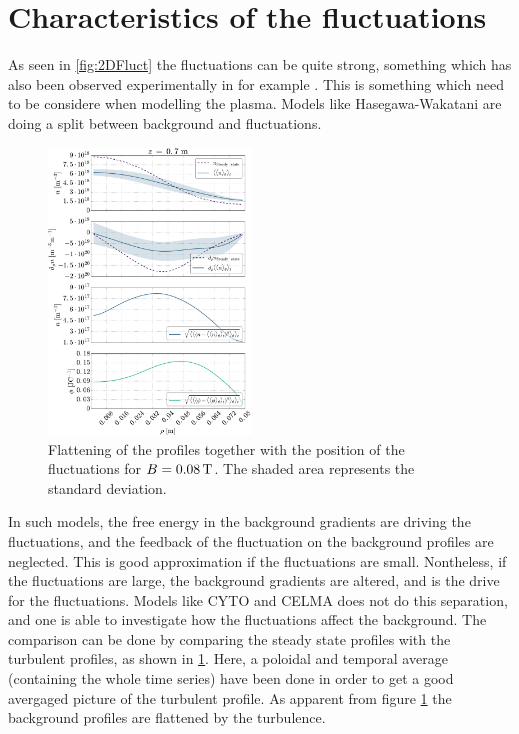 \section{Characteristics of the fluctuations}
As seen in \cref{fig:2DFluct} the fluctuations can be quite strong, something which has also been observed experimentally in for example \cite{Burin2005}.
This is something which need to be considere when modelling the plasma.
Models like Hasegawa-Wakatani \cite{Hasegawa1987,Holland2007} are doing a split between background and fluctuations.
%
\begin{figure}
    \begin{center}
    \includegraphics[width=0.48\textwidth]{fig/results/posOfFluct/posOfFluctB008}
    \end{center}
    \caption{Flattening of the profiles together with the position of the fluctuations for $B=0.08\, \text{T}$.
        The shaded area represents the standard deviation.
    }
    \label{fig:posOfFluct008}
\end{figure}
%
In such models, the free energy in the background gradients are driving the fluctuations, and the feedback of the fluctuation on the background profiles are neglected.
This is good approximation if the fluctuations are small.
Nontheless, if the fluctuations are large, the background gradients are altered, and is the drive for the fluctuations.
Models like CYTO \cite{Naulin2008,Windisch2011a,Windisch2011b} and CELMA does not do this separation, and one is able to investigate how the fluctuations affect the background.
The comparison can be done by comparing the steady state profiles with the turbulent profiles, as shown in \cref{fig:posOfFluct008}.
Here, a poloidal and temporal average (containing the whole time series) have been done in order to get a good avergaged picture of the turbulent profile.
As apparent from figure \cref{fig:posOfFluct008} the background profiles are flattened by the turbulence.

